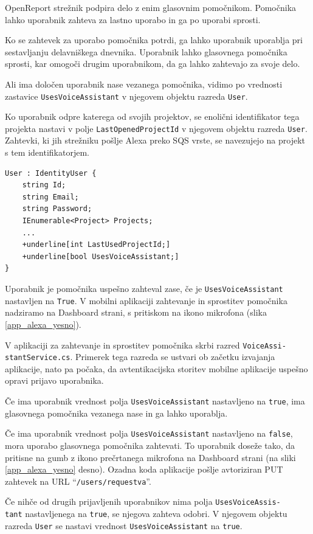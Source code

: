 \documentclass[a4paper, 12pt]{book}
\begin{document}
OpenReport strežnik podpira delo z enim glasovnim pomočnikom.
Pomočnika lahko uporabnik {zahteva} za lastno uporabo in ga po uporabi {sprosti}.

Ko se zahtevek za uporabo pomočnika potrdi, ga lahko uporabnik uporablja pri sestavljanju delavniškega dnevnika.
Uporabnik lahko glasovnega pomočnika sprosti, kar omogoči drugim uporabnikom, da ga lahko zahtevajo za svoje delo.

Ali ima določen uporabnik nase vezanega pomočnika, vidimo po vrednosti zastavice \texttt{UsesVoiceAssistant} v njegovem objektu razreda \texttt{User}.

Ko uporabnik odpre katerega od svojih projektov, se enolični identifikator tega projekta nastavi v polje \texttt{LastOpenedProjectId} v njegovem objektu razreda \texttt{User}.
Zahtevki, ki jih strežniku pošlje Alexa preko SQS vrste, se navezujejo na projekt s tem identifikatorjem.

\begin{Verbatim}[commandchars=+\[\]]
User : IdentityUser {
    string Id; 
    string Email;
    string Password; 
    IEnumerable<Project> Projects;
    ... 
    +underline[int LastUsedProjectId;]
    +underline[bool UsesVoiceAssistant;]
}
\end{Verbatim}

Uporabnik je pomočnika uspešno zahteval zase, če je \texttt{UsesVoiceAssistant} nastavljen na \texttt{True}.
V mobilni aplikaciji zahtevanje in sprostitev pomočnika nadziramo na {Dashboard} strani, s pritiskom na ikono mikrofona (slika \ref{app_alexa_yesno}).

V aplikaciji za zahtevanje in sprostitev pomočnika skrbi razred \texttt{VoiceAssi-\\stantService.cs}.
Primerek tega razreda se ustvari ob začetku izvajanja aplikacije, nato pa počaka, da avtentikacijska storitev mobilne aplikacije uspešno opravi prijavo uporabnika.

Če ima uporabnik vrednost polja \texttt{UsesVoiceAssistant} nastavljeno na \texttt{true}, ima glasovnega pomočnika vezanega nase in ga lahko uporablja.

Če ima uporabnik vrednost polja \texttt{UsesVoiceAssistant} nastavljeno na \texttt{false}, mora uporabo glasovnega pomočnika zahtevati.
To uporabnik doseže tako, da pritisne na gumb z ikono prečrtanega mikrofona na Dashboard strani (na sliki \ref{app_alexa_yesno} desno).
Ozadna koda aplikacije pošlje avtoriziran PUT zahtevek na URL \enquote{\texttt{/users/requestva}}.

Če nihče od drugih prijavljenih uporabnikov nima polja \texttt{UsesVoiceAssis-\\tant} nastavljenega na \texttt{true}, se njegova zahteva odobri.
V njegovem objektu razreda \texttt{User} se nastavi vrednost \texttt{UsesVoiceAssistant} na \texttt{true}.
\end{document}
